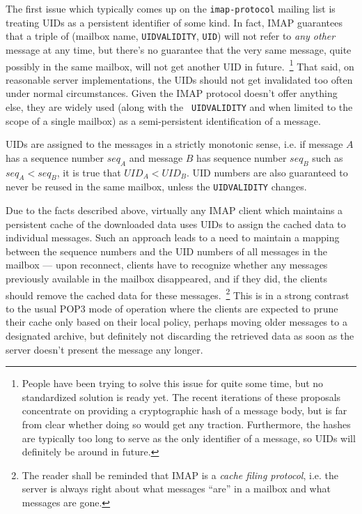 \documentclass[trojita]{subfiles}
\begin{document}
The first issue which typically comes up on the {\tt imap-protocol} mailing list is treating UIDs as a persistent
identifier of some kind.  In fact, IMAP guarantees that a triple of (mailbox name, {\tt UIDVALIDITY}, {\tt UID}) will
not refer to {\em any other} message at any time, but there's no guarantee that the very same message, quite possibly in
the same mailbox, will not get another UID in future.~\footnote{People have been trying to solve this issue for quite
some time, but no standardized solution is ready yet.  The recent iterations of these proposals concentrate on providing
a cryptographic hash of a message body, but is far from clear whether doing so would get any traction.  Furthermore, the
hashes are typically too long to serve as the only identifier of a message, so UIDs will definitely be around in
future.}  That said, on reasonable server implementations, the UIDs should not get invalidated too often under normal
circumstances.  Given the IMAP protocol doesn't offer anything else, they are widely used (along with the {\tt
UIDVALIDITY} and when limited to the scope of a single mailbox) as a semi-persistent identification of a message.

UIDs are assigned to the messages in a strictly monotonic sense, i.e. if message $A$ has a sequence number $seq_A$ and
message $B$ has sequence number $seq_B$ such as $seq_A < seq_B$, it is true that $UID_A < UID_B$.  UID numbers are also
guaranteed to never be reused in the same mailbox, unless the {\tt UIDVALIDITY} changes.

Due to the facts described above, virtually any IMAP client which maintains a persistent cache of the downloaded data
uses UIDs to assign the cached data to individual messages.  Such an approach leads to a need to maintain a mapping
between the sequence numbers and the UID numbers of all messages in the mailbox --- upon reconnect, clients have to
recognize whether any messages previously available in the mailbox disappeared, and if they did, the clients should
remove the cached data for these messages.~\footnote{The reader shall be reminded that IMAP is a {\em cache filing
protocol}, i.e. the server is always right about what messages ``are'' in a mailbox and what messages are gone.}  This
is in a strong contrast to the usual POP3 mode of operation where the clients are expected to prune their cache only
based on their local policy, perhaps moving older messages to a designated archive, but definitely not discarding the
retrieved data as soon as the server doesn't present the message any longer.
\end{document}

